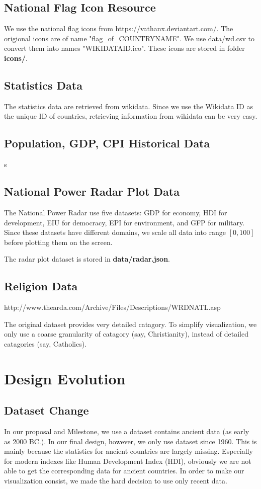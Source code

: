\documentclass[12pt, fullpage,letterpaper]{article}
\begin{document}
\subsection{National Flag Icon Resource}

    We use the national flag icons from https://vathanx.deviantart.com/.
    The origional icons are of name "flag\_of\_COUNTRYNAME". We use data/wd.csv
    to convert them into names "WIKIDATAID.ico". These icons are stored in folder \textbf{icons/}.


\subsection{Statistics Data}
    The statistics data are retrieved from wikidata. Since we use the Wikidata ID as the unique ID of countries,
    retrieving information from wikidata can be very easy.

\subsection{Population, GDP, CPI Historical Data}
    s
\subsection{National Power Radar Plot Data}
    The National Power Radar use five datasets: GDP for economy, HDI for
    development, EIU for democracy, EPI for environment, and GFP for military.
    Since these datasets have different domains, we scale all data into range
    $[0,100]$ before plotting them on the screen.

    The radar plot dataset is stored in \textbf{data/radar.json}.

\subsection{Religion Data}
    http://www.thearda.com/Archive/Files/Descriptions/WRDNATL.asp

    The original dataset provides very detailed catagory. To simplify visualization,
    we only use a coarse granularity of catagory (say, Christianity), instead of detailed catagories (say, Catholics).

\section{Design Evolution}
    \subsection{Dataset Change}
        In our proposal and Milestone, we use a dataset contains ancient data (as early as 2000 BC.).
        In our final design, however, we only use dataset since 1960.
        This is mainly because the statistics for ancient countries are largely missing.
        Especially for modern indexes like Human Development Index (HDI), obviously we are not able to get the corresponding data for ancient countries.
        In order to make our visualization consist, we made the hard decision to use only recent data.
\end{document}
